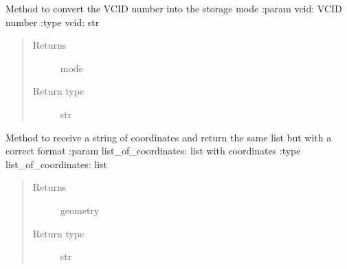 
\begin{fulllineitems}
\label{\detokenize{s2boa.ingestions:s2boa.ingestions.functions.get_vcid_mode}}
Method to convert the VCID number into the storage mode
:param vcid: VCID number
:type vcid: str
\begin{quote}\begin{description}
\item[{Returns}] \leavevmode
mode

\item[{Return type}] \leavevmode
str

\end{description}\end{quote}

\end{fulllineitems}


\begin{fulllineitems}
\label{\detokenize{s2boa.ingestions:s2boa.ingestions.functions.insert_ingestion_progress}}
\end{fulllineitems}


\begin{fulllineitems}
\label{\detokenize{s2boa.ingestions:s2boa.ingestions.functions.list_of_coordinates_to_str_geometry}}
Method to receive a string of coordinates and return the same list but with a correct format
:param list\_of\_coordinates: list with coordinates
:type list\_of\_coordinates: list
\begin{quote}\begin{description}
\item[{Returns}] \leavevmode
geometry

\item[{Return type}] \leavevmode
str

\end{description}\end{quote}

\end{fulllineitems}

